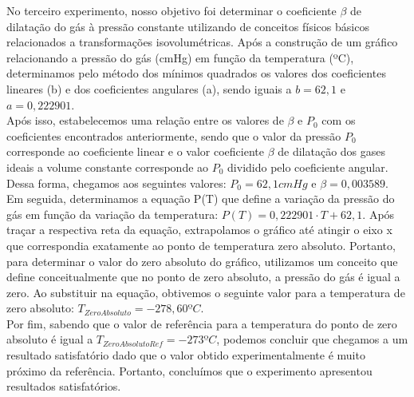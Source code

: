 No terceiro experimento, nosso objetivo foi determinar o coeficiente $\beta$ de dilatação do gás à pressão constante utilizando de conceitos físicos básicos relacionados a transformações isovolumétricas. Após a construção de um gráfico relacionando a pressão do gás (cmHg) em função da temperatura (ºC), determinamos pelo método dos mínimos quadrados os valores dos coeficientes lineares (b) e dos coeficientes angulares (a), sendo iguais a $b = 62,1$ e $a = 0,222901$.\\

Após isso, estabelecemos uma relação entre os valores de $\beta$ e $P_0$ com os coeficientes encontrados anteriormente, sendo que o valor da pressão $P_0$ corresponde ao coeficiente linear e o valor coeficiente $\beta$ de dilatação dos gases ideais a volume constante corresponde ao $P_0$ dividido pelo coeficiente angular. Dessa forma, chegamos aos seguintes valores: $P_0 = 62,1 cmHg$ e $\beta = 0,003589$.\\

Em seguida, determinamos a equação P(T) que define a variação da pressão do gás em função da variação da temperatura: $P(T) = 0,222901 \cdot T + 62,1$. Após traçar a respectiva reta da equação, extrapolamos o gráfico até atingir o eixo x que correspondia exatamente ao ponto de temperatura zero absoluto. Portanto, para determinar o valor do zero absoluto do gráfico, utilizamos um conceito que define conceitualmente que no ponto de zero absoluto, a pressão do gás é igual a zero. Ao substituir na equação, obtivemos o seguinte valor para a temperatura de zero absoluto: $T_{Zero Absoluto}= -278,60 ºC$.\\

Por fim, sabendo que o valor de referência para a temperatura do ponto de zero absoluto é igual a $T_{Zero Absoluto Ref}= -273 ºC$, podemos concluir que chegamos a um resultado satisfatório dado que o valor obtido experimentalmente é muito próximo da referência. Portanto, concluímos que o experimento apresentou resultados satisfatórios.
